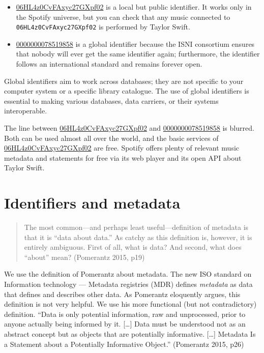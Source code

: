 \documentclass[
  letterpaper,
  DIV=11,
  numbers=noendperiod]{scrreprt}
\begin{document}
\begin{itemize}
\item
  \href{https://open.spotify.com/artist/06HL4z0CvFAxyc27GXpf02}{06HL4z0CvFAxyc27GXpf02}
  is a local but public identifier. It works only in the Spotify
  universe, but you can check that any music connected to
  \texttt{06HL4z0CvFAxyc27GXpf02} is performed by Taylor Swift.
\item
  \href{https://isni.org/isni/0000000078519858}{0000000078519858} is a
  global identifier because the ISNI consortium ensures that nobody will
  ever get the same identifier again; furthermore, the identifier
  follows an international standard and remains forever open.
\end{itemize}

Global identifiers aim to work across databases; they are not specific
to your computer system or a specific library catalogue. The use of
global identifiers is essential to making various databases, data
carriers, or their systems interoperable.

The line between
\href{https://open.spotify.com/artist/06HL4z0CvFAxyc27GXpf02}{06HL4z0CvFAxyc27GXpf02}
and \href{https://isni.org/isni/0000000078519858}{0000000078519858} is
blurred. Both can be used almost all over the world, and the basic
services of
\href{https://open.spotify.com/artist/06HL4z0CvFAxyc27GXpf02}{06HL4z0CvFAxyc27GXpf02}
are free. Spotify offers plenty of relevant music metadata and
statements for free via its web player and its open API about Taylor
Swift.

\section{Identifiers and metadata}\label{identifiers-and-metadata}

\begin{quote}
The most common---and perhaps least useful---definition of metadata is
that it is ``data about data.'' As catchy as this definition is,
however, it is entirely ambiguous. First of all, what is data? And
second, what does ``about'' mean? (Pomerantz 2015, p19)
\end{quote}

We use the definition of Pomerantz about metadata. The new ISO standard
on Information technology --- Metadata registries (MDR) defines
\emph{metadata} as data that defines and describes other data. As
Pomerantz eloquently argues, this definition is not very helpful. We use
his more functional (but not contradictory) definition. ``Data is only
potential information, raw and unprocessed, prior to anyone actually
being informed by it. {[}\ldots{]} Data must be understood not as an
abstract concept but as objects that are potentially informative.
{[}\ldots{]} Metadata Is a Statement about a Potentially Informative
Object.'' (Pomerantz 2015, p26)
\end{document}
